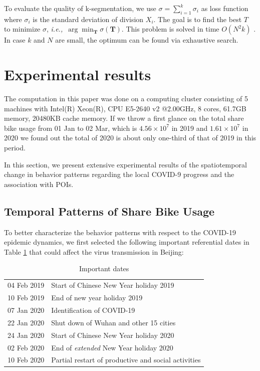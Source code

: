 \documentclass[ijgi,submit,moreauthors,pdftex]{Definitions/mdpi}
\begin{document}
To evaluate the quality of k-segmentation, we use $\sigma=\sum_{i=1}^{k}{\sigma_i}$ as loss function where $\sigma_i$ is the standard deviation of division $X_i$. 
The goal is to find the best $T$ to minimize $\sigma$, \textit{i.e.,}\ $\arg\min_{\mathbf{T}}\sigma(\mathbf{T})$.
This problem is solved in time $O(N^2k)$ \cite{terzi2006efficient}.
In case $k$ and $N$ are small, the optimum can be found via exhaustive search.


\section{Experimental results}\label{sec:experimental results}
The computation in this paper was done on a computing cluster consisting of 5 machines with Intel(R) Xeon(R), CPU E5-2640 v2 @2.00GHz, 8 cores, 61.7GB memory, 20480KB cache memory. 
If we throw a first glance on the total share bike usage from 01 Jan to 02 Mar, which is $4.56\times10^7$ in 2019 and $1.61\times10^7$ in 2020 we found out the total of 2020 is about only one-third of that of 2019 in this period.

In this section, we present extensive experimental results of the spatiotemporal change in behavior patterns regarding the local COVID-9 progress and the association with POIs.

\subsection{Temporal Patterns of Share Bike Usage}
To better characterize the behavior patterns with respect to the COVID-19 epidemic dynamics, we first selected the following important referential dates in Table \ref{tab:important_dates} that could affect the virus transmission in Beijing: 

\begin{table}[ht]
    \centering
    \begin{tabular}{ll}
    04 Feb 2019 & Start of Chinese New Year holiday 2019\\
    10 Feb 2019 & End of new year holiday 2019\\
    07 Jan 2020 & Identification of COVID-19\\
    22 Jan 2020 & Shut down of Wuhan and other 15 cities\\
    24 Jan 2020 & Start of Chinese New Year holiday 2020\\
    02 Feb 2020 & End of \textit{extended} New Year holiday 2020\\
    10 Feb 2020 & Partial restart of productive and social activities
    \end{tabular}
    \caption{Important dates}
    \label{tab:important_dates}
\end{table}
\end{document}
